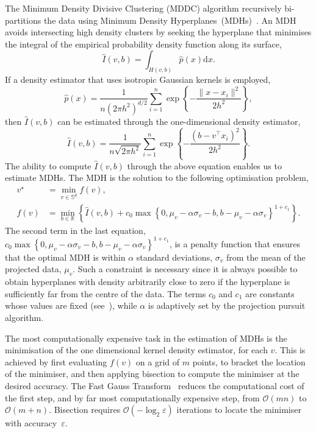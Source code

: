 \documentclass{book}
\def\R{\mathbb{R}}
\begin{document}
The Minimum Density Divisive Clustering (MDDC) algorithm recursively
bi-partitions the data using Minimum Density
Hyperplanes~(MDHs)~\cite{PavlidisHT2016}. An MDH
avoids intersecting high density clusters by seeking the hyperplane
that minimises the integral of the empirical probability density function along
its surface,
%
\[
\hat{I}(v,b) = \int_{ H(v,b)} \hat{p}(x) \mathrm{d} x.
\]
%
If a density estimator that uses isotropic Gaussian kernels is employed,
%
\[
\hat{p}(x) = \frac{1}{n (2 \pi h^2)^{d/2} } \sum_{i=1}^n \exp \left\{ -\frac{ \|x - x_i \|^2}{2 h^2} \right\},
\]
%
then $\hat{I}(v,b)$ can be estimated through the one-dimensional density estimator,
%
\[
\hat{I}(v,b) = \frac{1}{n\sqrt{2\pi h^2 }} \sum_{i=1}^n  \exp \left\{- \frac{ (b - v^\top x_i)^2 }{2 h^2} \right\}.
\]
%
The ability to compute $\hat{I}(v,b)$ through the above equation enables us to
estimate MDHs. The MDH is the solution to the following optimisation problem,
%
\begin{align}
%
v^\star & = \min_{v \in \mathbb{S}^d} f(v), \label{eq:mdh1} \\
%
f(v) & = \min_{b \in \R} \left\{ \hat{I}(v,b) + c_0 \max \left\{0, \mu_v  -\alpha
\sigma_v - b, b - \mu_v  -\alpha \sigma_v \right\}^{1+c_1} \right\}. \label{eq:mdh2}
%
\end{align}
%
The second term in the last equation, $c_0 \max \left\{0, \mu_v  -\alpha
\sigma_v - b, b - \mu_v  -\alpha \sigma_v \right\}^{1+c_1}$,
is a penalty function that ensures that
the optimal MDH is within $\alpha$ standard deviations, $\sigma_v$ from the mean of the
projected data, $\mu_v$. Such a constraint is necessary since it is always possible
to obtain hyperplanes with density arbitrarily close to zero if the hyperplane is sufficiently
far from the centre of the data.
%
The terms $c_0$ and $c_1$ are constants whose values are fixed (see~\cite{PavlidisHT2016}),
while $\alpha$ is adaptively set by the projection pursuit algorithm.


The most computationally expensive task in the estimation of MDHs is the minimisation of
the one dimensional kernel density estimator, for each $v$.
This is achieved by first evaluating $f(v)$ on a grid of $m$ points, to bracket the location
of the minimiser, and then applying bisection to compute the minimiser
at the desired accuracy.
%
The Fast Gauss Transform~\cite{Morariu08} reduces the computational
cost of the first step, and by far most computationally expensive step,
from $\mathcal{O}(mn)$ to $\mathcal{O}(m+n)$. Bisection requires $\mathcal{O}(-\log_2
\varepsilon)$ iterations to locate the minimiser with accuracy~$\varepsilon$.
\end{document}
